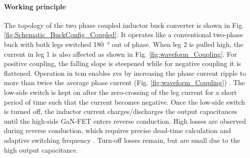 \documentclass{IPEC2026TEC}
\newcommand{\ac}{\gls}
\begin{document}
\paragraph{Working principle}
The topology of the two phase coupled inductor buck converter is shown in Fig. \ref{fig:Schematic_BuckConfig_Coupled}. It operates like a conventional two-phase buck with both legs switched \qty{180}{\degree} out of phase. When leg 2 is pulled high, the current in leg 1 is also affected as shown in Fig. \ref{fig:waveform_Coupling}. For positive coupling, the falling slope is steepened while for negative coupling it is flattened. 
Operation in \ac{tcm} enables \ac{zvs} by increasing the phase current ripple to more than twice the average phase current (Fig. \ref{fig:waveform_Coupling}) \cite{henzeZerovoltageSwitchingHigh1988}. The low-side switch is kept on after the zero-crossing of the leg current for a short period of time such that the current becomes negative. Once the low-side switch is turned off, the inductor current charges/discharges the output capacitances until the high-side GaN-FET enters reverse conduction. High losses are observed during reverse conduction, which requires precise dead-time calculation and adaptive switching frequency \cite{haiderAnalyticalCalculationResidual2021}. Turn-off losses remain, but are small due to the high output capacitance.
\end{document}
